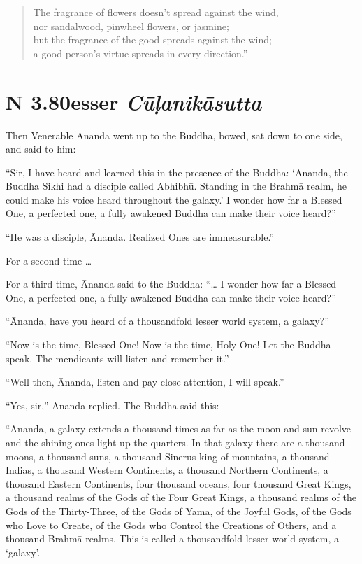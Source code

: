 \documentclass[12pt,openany]{book}%
\newcommand*{\suttatitleacronym}[1]{\smaller[2]{#1}\vspace*{.3em}}
\newcommand*{\suttatitletranslation}[1]{\linebreak{#1}}
\newcommand*{\suttatitleroot}[1]{\linebreak\smaller[2]\itshape{#1}}
\newcommand*{\tocacronym}[1]{\hspace*{-3.3em}{#1}\quad}
\newcommand*{\toctranslation}[1]{#1}
\newcommand*{\tocroot}[1]{(\textit{#1})}
\begin{document}
\begin{verse}%
The fragrance of flowers doesn’t spread against the wind, \\
nor sandalwood, pinwheel flowers, or jasmine; \\
but the fragrance of the good spreads against the wind; \\
a good person’s virtue spreads in every direction.” 

%
\end{verse}

%
\section*{{\suttatitleacronym AN 3.80}{\suttatitletranslation Lesser }{\suttatitleroot Cūḷanikāsutta}}
\addcontentsline{toc}{section}{\tocacronym{AN 3.80} \toctranslation{Lesser } \tocroot{Cūḷanikāsutta}}

Then Venerable Ānanda went up to the Buddha, bowed, sat down to one side, and said to him: 

“Sir, I have heard and learned this in the presence of the Buddha: ‘Ānanda, the Buddha Sikhi had a disciple called \textsanskrit{Abhibhū}. Standing in the \textsanskrit{Brahmā} realm, he could make his voice heard throughout the galaxy.’ I wonder how far a Blessed One, a perfected one, a fully awakened Buddha can make their voice heard?” 

“He was a disciple, Ānanda. Realized Ones are immeasurable.” 

For a second time … 

For a third time, Ānanda said to the Buddha: “… I wonder how far a Blessed One, a perfected one, a fully awakened Buddha can make their voice heard?” 

“Ānanda, have you heard of a thousandfold lesser world system, a galaxy?” 

“Now is the time, Blessed One! Now is the time, Holy One! Let the Buddha speak. The mendicants will listen and remember it.” 

“Well then, Ānanda, listen and pay close attention, I will speak.” 

“Yes, sir,” Ānanda replied. The Buddha said this: 

“Ānanda, a galaxy extends a thousand times as far as the moon and sun revolve and the shining ones light up the quarters. In that galaxy there are a thousand moons, a thousand suns, a thousand Sinerus king of mountains, a thousand Indias, a thousand Western Continents, a thousand Northern Continents, a thousand Eastern Continents, four thousand oceans, four thousand Great Kings, a thousand realms of the Gods of the Four Great Kings, a thousand realms of the Gods of the Thirty-Three, of the Gods of Yama, of the Joyful Gods, of the Gods who Love to Create, of the Gods who Control the Creations of Others, and a thousand \textsanskrit{Brahmā} realms. This is called a thousandfold lesser world system, a ‘galaxy’. 
\end{document}
